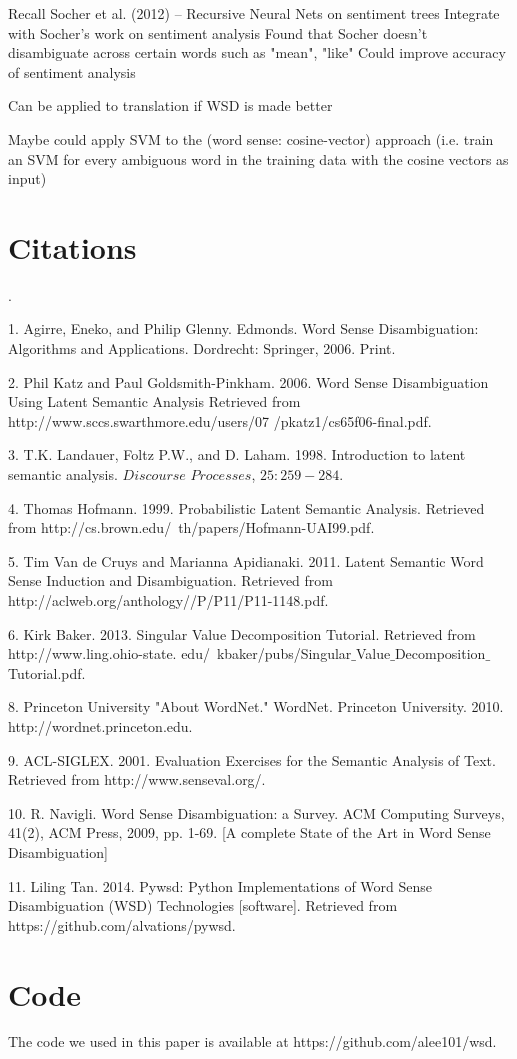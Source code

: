 \documentclass[10pt, letterpaper]{article}
\begin{document}
	Recall Socher et al. (2012) -- Recursive Neural Nets on sentiment trees
	Integrate with Socher's work on sentiment analysis
	Found that Socher doesn't disambiguate across certain words such as "mean", "like"
	Could improve accuracy of sentiment analysis	

	Can be applied to translation if WSD is made better

	Maybe could apply SVM to the (word sense: cosine-vector) approach (i.e. train an SVM 
	for every ambiguous word in the training data with the cosine vectors as input)

	\section{Citations} 
	.

	1. Agirre, Eneko, and Philip Glenny. Edmonds. Word Sense Disambiguation: Algorithms and Applications. Dordrecht: Springer, 2006. Print.

	2. Phil Katz and Paul Goldsmith-Pinkham. 2006. Word Sense Disambiguation Using Latent Semantic Analysis Retrieved from http://www.sccs.swarthmore.edu/users/07 /pkatz1/cs65f06-final.pdf.

	3. T.K. Landauer, Foltz P.W., and D. Laham. 1998. Introduction to latent semantic analysis. $\textit{Discourse Processes}$, $25:259-284$. 

	4. Thomas Hofmann. 1999. Probabilistic Latent Semantic Analysis. Retrieved from http://cs.brown.edu/~th/papers/Hofmann-UAI99.pdf. 

	5. Tim Van de Cruys and Marianna Apidianaki. 2011. Latent Semantic Word Sense Induction and Disambiguation. Retrieved from http://aclweb.org/anthology//P/P11/P11-1148.pdf. 

	6. Kirk Baker. 2013. Singular Value Decomposition Tutorial. Retrieved from http://www.ling.ohio-state. edu/~kbaker/pubs/Singular$\_$Value$\_$Decomposition$\_$Tutorial.pdf. 

	8. Princeton University "About WordNet." WordNet. Princeton University. 2010. http://wordnet.princeton.edu. 
    
    9. ACL-SIGLEX. 2001. Evaluation Exercises for the Semantic Analysis of Text. Retrieved from http://www.senseval.org/. 
    
	10. R. Navigli. Word Sense Disambiguation: a Survey. ACM Computing Surveys, 41(2), ACM Press, 2009, pp. 1-69. [A complete State of the Art in Word Sense Disambiguation]

    11. Liling Tan. 2014. Pywsd: Python Implementations of Word Sense Disambiguation (WSD) Technologies [software]. Retrieved from https://github.com/alvations/pywsd. 

	\section{Code}

	The code we used in this paper is available at https://github.com/alee101/wsd. 


 
\end{document}
